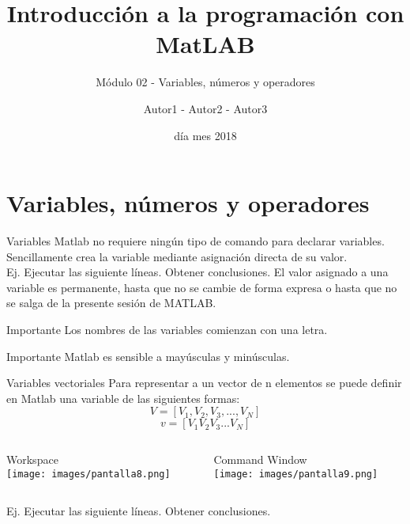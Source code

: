 \documentclass{bredelebeamer}
\title[Programación en MatLAB]{Introducción a la programación con MatLAB}
\subtitle{Módulo 02 - Variables, números y operadores}
\author{Autor1 - Autor2 - Autor3\inst{1}}
\institute[UTN.BA]
{
  \inst{1}%
  Universidad Tecnológica Nacional\\
  Facultad Regional Buenos Aires
  }
\date{día mes 2018}
\begin{document}
\begin{frame}
  \titlepage 
\end{frame}




\section{Variables, números y operadores}

\begin{frame}{Variables}
Matlab no requiere ningún tipo de comando para declarar variables. Sencillamente crea la variable mediante asignación directa de su valor. 
\\Ej. Ejecutar las siguiente líneas. Obtener conclusiones.
El valor asignado a una variable es permanente, hasta que no se cambie de forma expresa o hasta que no se salga de la presente sesión de MATLAB.
\begin{alertblock}{Importante}
Los nombres de las variables comienzan con una letra.
\end{alertblock}
\begin{alertblock}{Importante}
Matlab es sensible a mayúsculas y minúsculas.
\end{alertblock}
\end{frame}

\begin{frame}{Variables vectoriales}
Para representar a un vector de n elementos se puede definir en Matlab una variable de las siguientes formas:
\begin{equation*}
V = [V_1,V_2,V_3,...,V_N]
\end{equation*}
\begin{equation*}
v = [V_1 V_2 V_3 ... V_N]
\end{equation*}
\begin{columns}
\begin{column}{0.5\textwidth}
\begin{center}
Workspace\\
\texttt{[image: images/pantalla8.png]}
\end{center}
\end{column}
\begin{column}{0.5\textwidth}
\begin{center}
Command Window\\
\texttt{[image: images/pantalla9.png]}
\end{center}
\end{column}
\end{columns}
Ej. Ejecutar las siguiente líneas. Obtener conclusiones.
\end{frame}
\end{document}
